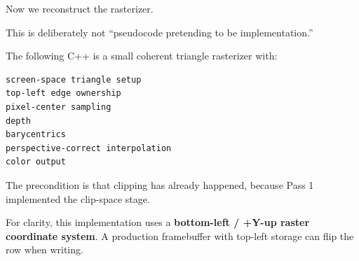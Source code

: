 Now we reconstruct the rasterizer.

This is deliberately not ``pseudocode pretending to be implementation.''

The following C++ is a small coherent triangle rasterizer with:

\begin{verbatim}
screen-space triangle setup
top-left edge ownership
pixel-center sampling
depth
barycentrics
perspective-correct interpolation
color output
\end{verbatim}

The precondition is that clipping has already happened, because Pass 1 implemented the clip-space stage.

For clarity, this implementation uses a \textbf{bottom-left / +Y-up raster coordinate system}. A production framebuffer with top-left storage can flip the row when writing.

